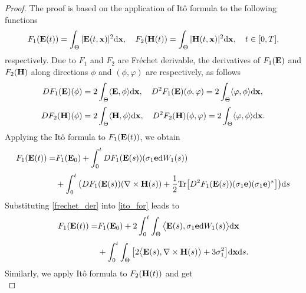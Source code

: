 \documentclass[preprint,12pt]{article}
\newtheorem{proof}{Proof}
\numberwithin{figure}{section}
\numberwithin{table}{section}
\numberwithin{equation}{section}
\begin{document}
\begin{proof}
The proof is based on the application of It\^o formula to the following functions
		\begin{equation*}
			F_1({\bf E}(t))=\int_\Theta|{\bf E}(t,{\bf x})|^2{\rm d}{\bf x},\quad F_2({\bf H}(t))=\int_\Theta|{\bf H}(t,{\bf x})|^2{\rm d}{\bf x},\quad t\in[0,T],
		\end{equation*} 
		respectively.
		Due to $F_1$ and $F_2$ are Fr\'echet derivable, the derivatives of $F_1({\bf E})$ and $F_2({\bf H})$ along directions $\phi$ and $(\phi,\varphi)$ are respectively, as follows 
		\begin{equation}\label{frechet_der}
			\begin{split}
				DF_1({\bf E})(\phi)&=2\int_\Theta\langle {\bf E},\phi\rangle{\rm d}{\bf x},\quad D^2F_1({\bf E})(\phi,\varphi)=2\int_\Theta\langle \varphi,\phi\rangle{\rm d}{\bf x},\\[1mm]
				DF_2({\bf H})(\phi)&=2\int_\Theta\langle {\bf H},\phi\rangle{\rm d}{\bf x},\quad D^2F_2({\bf H})(\phi,\varphi)=2\int_\Theta\langle \varphi,\phi\rangle{\rm d}{\bf x}.
			\end{split}
		\end{equation}
		Applying the It\^o formula to $F_1({\bf E}(t))$, we obtain
		\begin{equation}\label{ito_for}
			\begin{split}
				F_1({\bf E}(t))=&F_1({\bf E}_0)+\int_0^tDF_1({\bf E}(s))(\sigma_{1}{\bf{e}}{\rm d}W_1(s))\\[1mm]
				&+\int_0^t\big(DF_1({\bf E}(s))(\nabla\times {\bf H}(s))+\frac12{\rm Tr}\big[D^2F_1({\bf E}(s))(\sigma_{1}{\bf{e}})(\sigma_{1}{\bf{e}})^\ast\big]\big){\rm d}s
			\end{split}
		\end{equation}
		Substituting \eqref{frechet_der} into \eqref{ito_for} leads to
		\begin{equation}\label{ito_for_2}
			\begin{split}
				F_1({\bf E}(t))=&F_1({\bf E}_0)+2\int_0^t\int_\Theta\big\langle {\bf E}(s),\sigma_{1}{\bf{e}}{\rm d}W_1(s)\big\rangle {\rm d}{\bf x}\\[1mm]
				&+\int_0^t\int_\Theta\big[2\big\langle {\bf E}(s),\nabla\times {\bf H}(s)\big\rangle+3\sigma_{1}^2\big]{\rm d}{\bf x}{\rm d}s.
			\end{split}
		\end{equation}
		Similarly, we apply It\^o formula to $F_2({\bf H}(t))$ and get
		\begin{equation}\label{ito_for_3}

\end{equation}
\end{proof}
\end{document}
